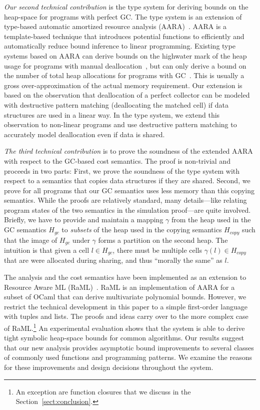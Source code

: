 \documentclass{easychair}
\theoremstyle{definition}
\begin{document}
\emph{Our second technical contribution} is the type system for
deriving bounds on the heap-space for programs with perfect GC. The
type system is an extension of type-based automatic amortized resource
analysis
(AARA)~\cite{Jost03,Jost10,VasconcelosJFH15,HoffmannAH10,HoffmannW15,NgoDFH16}. AARA
is a template-based technique that introduces potential functions to
efficiently and automatically reduce bound inference to linear
programming. Existing type systems based on AARA can derive bounds on
the highwater mark of the heap usage for programs with manual
deallocation~\cite{Jost10}, but can only derive a bound on the
number of total heap allocations for programs with
GC~\cite{HoffmannW15}. This is usually a gross over-approximation of
the actual memory requirement. Our extension is based on the
observation that deallocation of a perfect collector can be modeled
with destructive pattern matching (deallocating the matched cell) if
data structures are used in a linear way. In the type system, we
extend this observation to non-linear programs and use destructive
pattern matching to accurately model deallocation even if data is
shared.

\emph{The third technical contribution} is to prove the soundness of
the extended AARA with respect to the GC-based cost semantics. The
proof is non-trivial and proceeds in two parts: First, we prove the
soundness of the type system with respect to a semantics that copies
data structures if they are shared. Second, we prove for all programs
that our GC semantics uses less memory than this copying
semantics. While the proofs are relatively standard, many
details---like relating program states of the two semantics in the
simulation proof---are quite involved. Briefly, we have to provide and maintain 
a mapping $\gamma$ from the heap used in the GC semantics $H_{gc}$ to \emph{subsets} of
the heap used in the copying semantics $H_{copy}$ such that the image of 
$H_{gc}$ under $\gamma$ forms a partition on the second heap. The intuition is that 
given a cell $l \in H_{gc}$, there must be multiple cells $\gamma(l) \in H_{copy}$  
that are were allocated during sharing, and thus ``morally the same'' as $l$.

The analysis and the cost semantics have been implemented as an
extension to Resource Aware ML (RaML)~\cite{HoffmannAH10,HoffmannW15}. RaML is an
implementation of AARA for a subset of OCaml that can derive
multivariate polynomial bounds. However, we restrict the technical
development in this paper to a simple first-order language with
tuples and lists. The proofs and ideas carry over to the more
complex case of RaML.\footnote{An exception are function closures that
  we discuss in the Section~\ref{sect:conclusion}.}
%
An experimental evaluation shows that the system is able to derive
tight symbolic heap-space bounds for common algorithms. Our results
suggest that our new analysis provides asymptotic bound improvements
to several classes of commonly used functions and programming
patterns. We examine the reasons for these improvements and design
decisions throughout the system.
\end{document}
